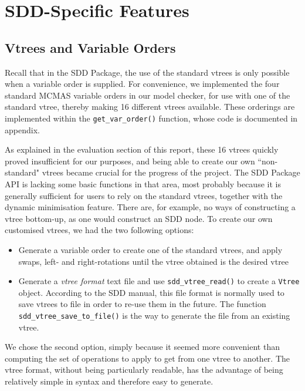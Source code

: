 \documentclass[11pt]{report}
\begin{document}
\section{SDD-Specific Features}

\subsection{Vtrees and Variable Orders}

Recall that in the SDD Package, the use of the standard vtrees is only possible when a variable order is supplied. For convenience, we implemented the four standard MCMAS variable orders in our model checker, for use with one of the standard vtree, thereby making 16 different vtrees available. These orderings are implemented within the \texttt{get\_var\_order()} function, whose code is documented in appendix. 

As explained in the evaluation section of this report, these 16 vtrees quickly proved insufficient for our purposes, and being able to create our own ``non-standard" vtrees became crucial for the progress of the project.  
The SDD Package API is lacking some basic functions in that area, most probably because it is generally sufficient for users to rely on the standard vtrees, together with the dynamic minimisation feature. There are, for example, no ways of constructing a vtree bottom-up, as one would construct an SDD node. To create our own customised vtrees, we had the two following options:
\begin{itemize}
\item Generate a variable order to create one of the standard vtrees, and apply swaps, left- and right-rotations until the vtree obtained is the desired vtree
\item Generate a \textit{vtree format} text file and use \texttt{sdd\_vtree\_read()} to create a \texttt{Vtree} object. According to the SDD manual, this file format is normally used to save vtrees to file in order to re-use them in the future. The function \texttt{sdd\_vtree\_save\_to\_file()} is the way to generate the file from an existing vtree.

\end{itemize}
We chose the second option, simply because it seemed more convenient than computing the set of operations to apply to get from one vtree to another. The vtree format, without being particularly readable, has the advantage of being relatively simple in syntax and therefore easy to generate. 
\end{document}

